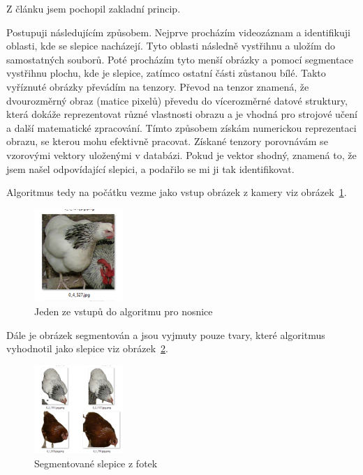 Z článku jsem pochopil zakladní princip.


Postupuji následujícím způsobem.
Nejprve procházím videozáznam a identifikuji oblasti, kde se slepice nacházejí.
Tyto oblasti následně vystřihnu a uložím do samostatných souborů.
Poté procházím tyto menší obrázky a pomocí segmentace vystřihnu plochu, kde je slepice, zatímco ostatní části zůstanou bílé.
Takto vyříznuté obrázky převádím na tenzory.
Převod na tenzor znamená, že dvourozměrný obraz (matice pixelů) převedu do vícerozměrné datové struktury, která dokáže reprezentovat různé vlastnosti obrazu a je vhodná pro strojové učení a další matematické zpracování.
Tímto způsobem získám numerickou reprezentaci obrazu, se kterou mohu efektivně pracovat.
Získané tenzory porovnávám se vzorovými vektory uloženými v databázi.
Pokud je vektor shodný, znamená to, že jsem našel odpovídající slepici, a podařilo se mi ji tak identifikovat.

Algoritmus tedy na počátku vezme jako vstup obrázek z kamery viz obrázek~\ref{fig:source_chick_image}.

\begin{figure}[H]
    \centering
    \includegraphics[width=0.3\textwidth]{img/source_chick_image}
    \caption{Jeden ze vstupů do algoritmu pro nosnice}
    \label{fig:source_chick_image}
\end{figure}

Dále je obrázek segmentován a jsou vyjmuty pouze tvary, které algoritmus vyhodnotil jako slepice viz obrázek~\ref{fig:segmented_chicks2}.

\begin{figure}[H]
    \centering
    \includegraphics[width=0.3\textwidth]{img/segmented_chicks}
    \caption{Segmentované slepice z fotek}
    \label{fig:segmented_chicks2}
\end{figure}

